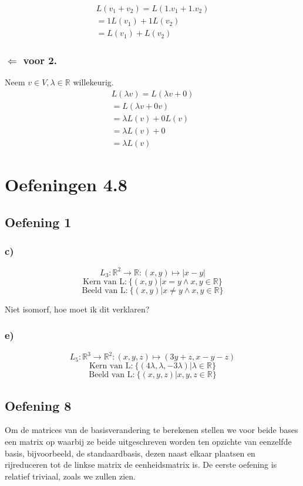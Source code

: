 \documentclass[lineaire_algebra_oplossingen.tex]{subfiles}
\begin{document}
\begin{align*}
L(v_1 + v_2) = L(1.v_1+1.v_2) \tag{co\"effici\"ent 1 in V}\\
=1L(v_1)+1L(v_2) \tag{wegens 3.}\\
=L(v_1)+L(v_2) \tag{co\"effici\"ent 1 in W}
\end{align*}

\subsubsection*{$\Leftarrow$ voor 2.}
Neem $v\in V, \lambda \in \mathbb{R}$ willekeurig.
\begin{align*}
L(\lambda v)=L(\lambda v + 0) \tag{neutraal element in V}\\
=L(\lambda v + 0v)\tag{Lemma 3.8}\\
=\lambda L(v) + 0 L(v) \tag{wegens 3.}\\
=\lambda L(v) + 0 \tag{Lemma 3.8 in W}\\
=\lambda L(v) \tag{neutraal element in W}
\end{align*}
\section{Oefeningen 4.8}
\subsection{Oefening 1}
\subsubsection{c)}
$$
L_3:\mathbb{R}^2\rightarrow\mathbb{R}:(x,y)\mapsto |x-y|
$$
$$
\text{Kern van L:} \ \{(x,y)|x=y \wedge x,y \in \mathbb{R} \}
$$
$$
\text{Beeld van L:} \ \{(x,y)|x\neq y \wedge x,y \in \mathbb{R} \}
$$
\begin{center}
Niet isomorf, hoe moet ik dit verklaren?
\end{center}
\subsubsection{e)}
$$
L_5:\mathbb{R}^3\rightarrow\mathbb{R}^2:(x,y,z)\mapsto (3y+z,x-y-z)
$$
$$
\text{Kern van L:} \ \{(4\lambda ,\lambda ,-3\lambda)|\lambda \in \mathbb{R} \}
$$
$$
\text{Beeld van L:} \ \{(x ,y ,z)|x,y,z \in \mathbb{R} \}
$$
\subsection{Oefening 8}
Om de matrices van de basisverandering te berekenen stellen we voor beide bases een matrix op waarbij ze beide uitgeschreven worden ten opzichte van eenzelfde basis, bijvoorbeeld, de standaardbasis, dezen naast elkaar plaatsen en rijreduceren tot de linkse matrix de eenheidsmatrix is. De eerste oefening is relatief triviaal, zoals we zullen zien.
\end{document}
